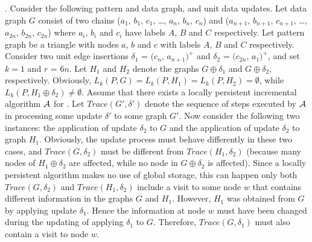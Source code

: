 
\vspace{-1.5ex}
.
Consider the following pattern and data graph, and unit data updates.
Let data graph $G$ consist of two chains ($a_1$, $b_1$, $c_1$, \ldots, $a_n$, $b_n$, $c_n$) and ($a_{n+1}$, $b_{n+1}$, $c_{n+1}$, \ldots, $a_{2n}$, $b_{2n}$, $c_{2n}$) where $a_i$, $b_i$ and $c_i$ have labels $A$, $B$ and $C$ respectively.
Let pattern graph be a triangle with nodes $a$, $b$ and $c$ with labels $A$, $B$ and $C$ respectively.
Consider two unit edge insertions $\delta_1$ = $(c_n$, $a_{n+1})^+$ and $\delta_2$ = $(c_{2n}$, $a_1)^+$,
and set $k = 1$ and $r$ = $6n$.
Let $H_1$ and $H_2$ denote the graphs $G\oplus \delta_1$ and $G\oplus \delta_2$, respectively.
Obviously, $L_{k}(P, G) = L_{k}(P, H_1) = L_{k}(P, H_2) = \emptyset$,
while $L_{k}(P, H_1\oplus \delta_2) \neq \emptyset$.
Assume that there exists a locally persistent incremental algorithm ${\cal A}$ for \dynteamF.
Let $Trace(G', \delta')$ denote the sequence of steps executed by ${\cal A}$ in processing some update $\delta'$ to some graph $G'$.
Now consider the following two instances: the application of update $\delta_2$ to $G$ and the application of update $\delta_2$ to graph $H_1$.
Obviously, the update process must behave differently in these two cases, and $Trace(G, \delta_2)$ must be different from $Trace(H_1, \delta_2)$
(because many nodes of $H_1\oplus \delta_2$ are affected, while no node in $G\oplus \delta_2$ is affected).
Since a locally persistent algorithm makes no use of global storage, this can happen only both $Trace(G, \delta_2)$ and $Trace(H_1, \delta_2)$ include a visit to some node $w$ that contains different information in the graphs $G$ and $H_1$.
However, $H_1$ was obtained from $G$ by applying update $\delta_1$.
Hence the information at node $w$ must have been changed during the updating of applying $\delta_1$ to $G$.
Therefore, $Trace(G, \delta_1)$ must also contain a visit to node $w$.
